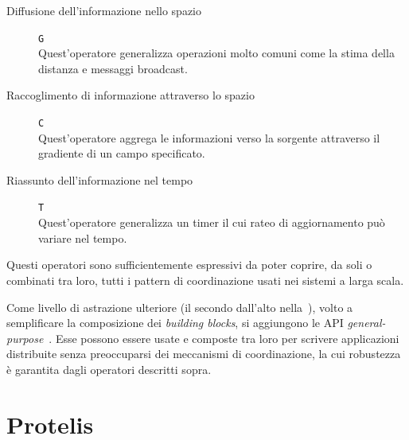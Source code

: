 \begin{description}
  \item[Diffusione dell'informazione nello spazio] \texttt{G} \\ %
    Quest'operatore generalizza operazioni molto comuni come la stima della distanza e messaggi broadcast.
  \item[Raccoglimento di informazione attraverso lo spazio] \texttt{C} \\ %
    Quest'operatore aggrega le informazioni verso la sorgente attraverso il gradiente di un campo specificato.
  \item[Riassunto dell'informazione nel tempo] \texttt{T} \\ %
    Quest'operatore generalizza un timer il cui rateo di aggiornamento può variare nel tempo.
\end{description}

Questi operatori sono sufficientemente espressivi da poter coprire, da soli o combinati tra loro, tutti i pattern di coordinazione usati nei sistemi a larga scala.

Come livello di astrazione ulteriore (il secondo dall'alto nella~), volto a semplificare la composizione dei \emph{building blocks}, si aggiungono le API \emph{general-purpose}~\cite{amslaurea13090}.
Esse possono essere usate e composte tra loro per scrivere applicazioni distribuite senza preoccuparsi dei meccanismi di coordinazione, la cui robustezza è garantita dagli operatori descritti sopra.

\section{Protelis}\label{sec:protelis}


